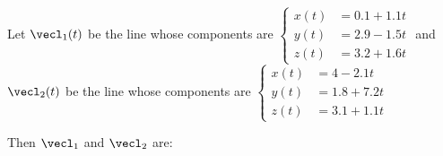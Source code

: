\documentclass{ximera}
\author{Gregory Hartman \and Matthew Carr}
\begin{document}
\begin{exercise}




Let $\vecl_{1}(t)$ be the line whose components are $\left\{ \begin{aligned}
x(t) & =0.1+1.1t\\
y(t) & =2.9-1.5t\\
z(t) & =3.2+1.6t
\end{aligned}
\right.$  and $\vecl_{2}(t)$ be the line whose components are $\left\{ \begin{aligned}
x(t) & =4-2.1t\\
y(t) & =1.8+7.2t\\
z(t) & =3.1+1.1t
\end{aligned}
\right.$

Then $\vecl_{1}$ and $\vecl_{2}$ are: 

\begin{multipleChoice}
\end{multipleChoice}


\end{exercise}
\end{document}

